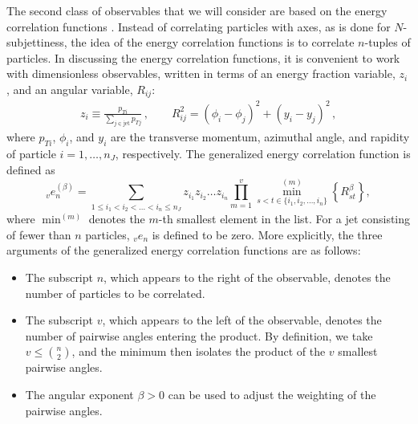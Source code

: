 \documentclass[11pt,letterpaper]{article}
\begin{document}
The second class of observables that we will consider are based on the energy correlation functions \cite{Larkoski:2013eya,Moult:2016cvt}.
%
Instead of correlating particles with axes, as is done for $N$-subjettiness, the idea of the energy correlation functions is to correlate $n$-tuples of particles.
%
In discussing the energy correlation functions, it is convenient to work with dimensionless observables, written in terms of an energy fraction variable, $z_i$, and an angular variable, $R_{ij}$:
\begin{align}\label{jetsub_2prong_eq:ptratio}  
z_i\equiv\frac{p_{Ti}}{\sum_{j \in \text{jet}} p_{Tj}}\,, \qquad   R_{ij}^2 = (\phi_i-\phi_j)^2+(y_i-y_j)^2\,,
\end{align}
where $p_{Ti}$, $\phi_i$, and $y_i$ are the transverse momentum,
azimuthal angle, and rapidity of particle $i=1,\dots,n_J$, respectively. 
%
%
The generalized energy correlation function is defined as
\begin{equation}\label{jetsub_2prong_eq:ecf_gen}
_v e_n^{(\beta)} = \sum_{1 \leq i_1 < i_2 < \dots < i_n \leq n_J} z_{i_1} z_{i_2} \dots z_{i_n} \prod_{m = 1}^{v} \min^{(m)}_{s < t \in \{i_1, i_2 , \dots, i_n \}} \left\{ R_{st}^{\beta} \right\},
\end{equation}
where $\min^{(m)}$ denotes the $m$-th smallest element in the list.  For a jet consisting of fewer than $n$ particles, $_v e_n$ is defined to be zero.  More explicitly, the three arguments of the generalized energy correlation functions are as follows:
\begin{itemize}
\item The subscript $n$, which appears to the right of the observable, denotes the number of particles to be correlated.   
\item The subscript $v$, which appears to the left of the observable, denotes the number of pairwise angles entering the product.  By definition, we take $v \leq \binom{n}{2}$, and the minimum then isolates the product of the $v$ smallest pairwise angles.
\item The angular exponent $\beta>0$ can be used to adjust the weighting of the pairwise angles.
\end{itemize}
\end{document}

